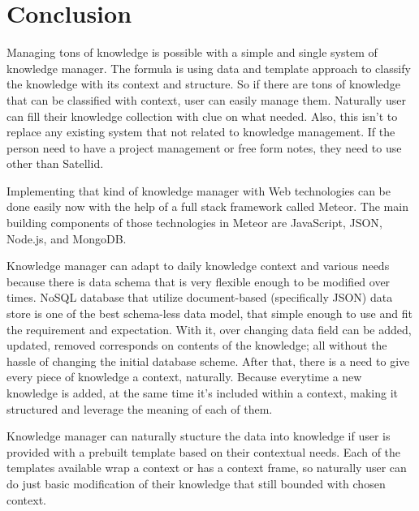 \section{Conclusion}
\label{sec:conclusion}

Managing tons of knowledge is possible with a simple and single system of knowledge manager.
The formula is using data and template approach to classify the knowledge with its context and structure.
So if there are tons of knowledge that can be classified with context, user can easily manage them.
Naturally user can fill their knowledge collection with clue on what needed.
Also, this isn't to replace any existing system that not related to knowledge management.
If the person need to have a project management or free form notes, they need to use other than Satellid.

Implementing that kind of knowledge manager with Web technologies can be done easily now with the help of a full stack framework called Meteor.
The main building components of those technologies in Meteor are JavaScript, \ac{JSON}, Node.js, and MongoDB.

Knowledge manager can adapt to daily knowledge context and various needs because there is data schema that is very flexible enough to be modified over times.
\ac{NoSQL} database that utilize document-based (specifically \ac{JSON}) data store is one of the best schema-less data model, that simple enough to use and fit the requirement and expectation.
With it, over changing data field can be added, updated, removed corresponds on contents of the knowledge; all without the hassle of changing the initial database scheme.
After that, there is a need to give every piece of knowledge a context, naturally.
Because everytime a new knowledge is added, at the same time it's included within a context, making it structured and leverage the meaning of each of them.

Knowledge manager can naturally stucture the data into knowledge if user is provided with a prebuilt template based on their contextual needs.
Each of the templates available wrap a context or has a context frame, so naturally user can do just basic modification of their knowledge that still bounded with chosen context.

